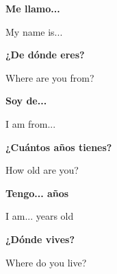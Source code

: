 \documentclass[avery5388,grid]{flashcards}
\begin{document}
\begin{flashcard}[Vocabulary]{\textbf{Me llamo...}}
    \begin{center}
        My name is...
    \end{center}
\end{flashcard}

\begin{flashcard}[Vocabulary]{\textbf{¿De dónde eres?}}
    \begin{center}
        Where are you from?
    \end{center}
\end{flashcard}

\begin{flashcard}[Vocabulary]{\textbf{Soy de...}}
    \begin{center}
        I am from...
    \end{center}
\end{flashcard}

\begin{flashcard}[Vocabulary]{\textbf{¿Cuántos años tienes?}}
    \begin{center}
        How old are you?
    \end{center}
\end{flashcard}

\begin{flashcard}[Vocabulary]{\textbf{Tengo... años}}
    \begin{center}
        I am... years old
    \end{center}
\end{flashcard}

\begin{flashcard}[Vocabulary]{\textbf{¿Dónde vives?}}
    \begin{center}
        Where do you live?
    \end{center}
\end{flashcard}
\end{document}
